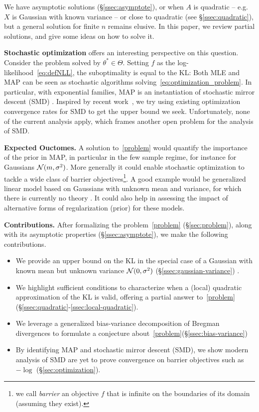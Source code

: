 \documentclass[twoside]{article}
\newcommand{\logpart}{A}
\newcommand{\nat}{\theta}
\begin{document}
We have asymptotic solutions (\S\ref{ssec:asymptote}),
or when $\logpart$ is quadratic -- e.g. $X$ is Gaussian with known variance --
or close to quadratic (see \S\ref{ssec:quadratic}),
but a  general solution for finite $n$ remains elusive.
In this paper, we review partial solutions, and give some ideas on how to solve it.

{\bf Stochastic optimization} offers an interesting perspective on this question.
Consider the problem
solved by $\nat^*\in \Theta$.
Setting $f$ as the log-likelihood~\eqref{eq:defNLL}, the suboptimality is equal to the KL:
\alignn{
	f(\nat) - f(\nat^*) = \KL\paren{p_{\nat^*} || p_{\nat} }
	\label{eq:suboptimalityKL}
}
Both MLE and MAP can be seen as stochastic algorithms solving~\eqref{eq:optimization_problem}.
In particular, with exponential families, MAP is an instantiation of stochastic mirror descent (SMD) \citep{nemirovski2009robust}.
Inspired by recent work~\citep{lepriol2021analysis, kunstner2020homeomorphic}, we try using existing optimization convergence rates for SMD to get the upper bound we seek.
Unfortunately, none of the current analysis apply, which frames another open problem for the analysis of SMD.

{\bf Expected Ouctomes.}
A solution to~\eqref{problem} would quantify the importance of the prior in MAP, in particular in the few sample regime, for instance for Gaussians ${\mathcal N}(m,\sigma^2)$. 
More generally it could enable stochastic optimization to tackle a wide class of barrier objectives\footnote{we call \emph{barrier} an objective $f$ that is infinite on the boundaries of its domain (assuming they exist).}.
A good example would be generalized linear model based on Gaussians with unknown mean and variance, for which there is currently no theory \citep{bach2013nonstronglyconvex}.
It could also help in assessing the impact of alternative forms of regularization (prior) for these models. 

{\bf Contributions.}
After formalizing the problem~\eqref{problem} (\S\ref{sec:problem}), along with its asymptotic properties (\S\ref{ssec:asymptote}), we make the following contributions.
\begin{itemize}
	\itemsep0em
	\item We provide an upper bound on the KL in the special case of a Gaussian with known mean but unknown variance ${\mathcal N}(0,\sigma^2)$ (\S\ref{ssec:gaussian-variance}) .
	\item We highlight sufficient conditions to characterize when a (local) quadratic approximation of the KL is valid, offering a partial answer to~\eqref{problem} (\S\ref{ssec:quadratic}-\ref{ssec:local-quadratic}).
	\item We leverage a generalized bias-variance decomposition of Bregman divergences\citep{pfau2013generalized}  to formulate a conjecture about~\eqref{problem}(\S\ref{ssec:bias-variance})
	\item By identifying MAP and stochastic mirror descent (SMD), we show modern analysis of SMD are yet to prove convergence on barrier objectives such as $-\log$ (\S\ref{sec:optimization}).
\end{itemize}
\end{document}
